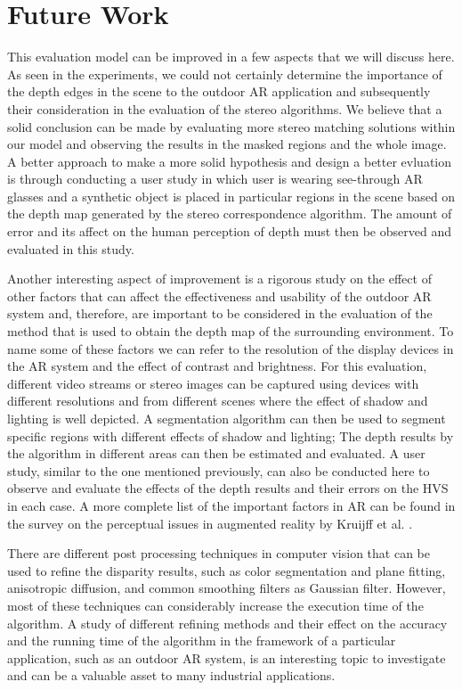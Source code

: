 \section{Future Work}
This evaluation model can be improved in a few aspects that we will discuss here.
As seen in the experiments, we could not certainly determine the importance of the depth edges in the scene to the outdoor AR application and subsequently their consideration in the evaluation 
of the stereo algorithms. We believe that a solid conclusion can be made by evaluating more stereo matching solutions
within our model and observing the results in the masked regions and the whole image. A better approach to make a more solid hypothesis and design a better 
evluation is through conducting a user study in which user is wearing see-through AR glasses and a synthetic object is placed in particular regions in the scene based on the depth map generated by the stereo correspondence algorithm. The amount of error and its affect on the human perception of depth must then be observed and evaluated in this study. 

Another interesting aspect of improvement is a rigorous study on the effect of other factors that can affect the effectiveness and 
usability of the outdoor AR system and, therefore, 
are important to be considered in the evaluation of the method that is used to obtain the depth map of the surrounding environment. 
To name some of these factors we can refer to
the resolution of the display devices in the AR system and the effect of contrast and brightness. 
For this evaluation, different video streams or stereo images can be captured using devices with different resolutions 
and from different scenes where the effect of shadow and lighting is well depicted. A segmentation algorithm can then be used to 
segment specific regions with different effects of shadow and lighting; The depth results by the algorithm in different areas can then be estimated and evaluated. 
A user study, similar to the one mentioned previously, can also be conducted here to observe and evaluate the effects of the depth results and 
their errors on the HVS in each case.  
A more complete list of the important factors in AR can be
found in the survey on the perceptual issues in augmented reality by Kruijff et al. \cite{kru10}.

There are different post processing techniques in computer vision that can be used to refine the disparity results, such as color segmentation and plane fitting, 
anisotropic diffusion, and common smoothing filters as Gaussian filter. However, most of these techniques can considerably increase the execution time of the algorithm.
A study of different refining methods and their effect on the accuracy and the running time of the algorithm in the framework of a particular application, 
such as an outdoor AR system, is an interesting topic to investigate and can be a valuable asset to many industrial applications.

